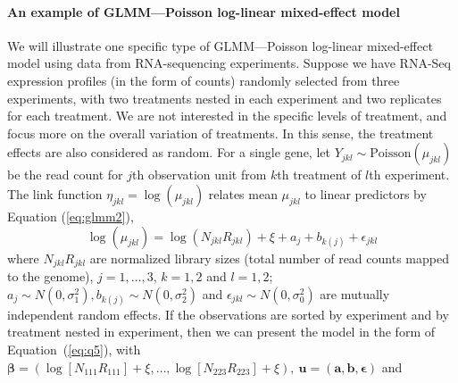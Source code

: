 	\paragraph{An example of GLMM---Poisson log-linear mixed-effect model}\label{poisson} 
	We will illustrate one specific type of GLMM---Poisson log-linear mixed-effect model using data from RNA-sequencing experiments. Suppose we have RNA-Seq expression profiles (in the form of counts) randomly selected from three experiments, with two treatments nested in each experiment and two replicates for each treatment. We are not interested in the specific levels of treatment, and focus more on the overall variation of treatments. In this sense, the treatment effects are also considered as random. For a single gene, let $Y_{jkl}\sim \text{Poisson}(\mu_{jkl})$ be the read count for $j$th observation unit from $k$th treatment of $l$th experiment. The link function $\eta_{jkl} = \log (\mu_{jkl})$ relates mean $\mu_{jkl}$ to linear predictors by Equation (\ref{eq:glmm2}),  
	\begin{equation}\label{eq:example}
	\log (\mu_{jkl}) = \log (N_{jkl}R_{jkl}) + \xi + a_{j} + b_{k(j)} + \epsilon_{jkl}
	\end{equation}
	where $N_{jkl}R_{jkl}$ are normalized library sizes (total number of read counts mapped to the genome),  $j=1, \ldots,  3$, $k=1, 2$ and $l=1, 2$; $a_j \sim N(0, \sigma_1^2), b_{k(j)}\sim N(0, \sigma_2^2)$ and $\epsilon_{jkl}\sim N(0, \sigma_0^2)$ are mutually independent random effects. If the observations are sorted by experiment and by treatment nested in experiment, then we can present the model in the form of Equation~(\ref{eq:q5}), with  $\bm \beta = (\log [N_{111}R_{111}]  + \xi,\ldots, \log [N_{223}R_{223}]  + \xi), ~\bm u = (\bm a, \bm b, \bm \epsilon)$ and 
